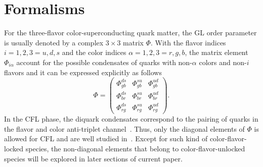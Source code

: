 \documentclass[12pt]{article}
\begin{document}
\section{\bf Formalisms}
\label{sec:2}
\vspace{0.2cm}

For the three-flavor color-superconducting quark matter, the GL order parameter is usually denoted by a complex $3\times3$ matrix $\Phi$. With the flavor indices $i = 1, 2, 3 = u, d, s$ and the color indices $\alpha = 1, 2, 3 = r, g, b$, the matrix element $\Phi_{i \alpha}$ account for the possible condensates of quarks with non-$\alpha$ colors and non-$i$ flavors and it can be expressed explicitly as follows
\begin{equation}
  \label{eq:diquarkmatrix}
  \Phi =
  \begin{pmatrix}
    \Phi_{gb}^{ds} &  \Phi_{gb}^{su} & \Phi_{gb}^{ud} \\
    \Phi_{br}^{ds} &  \Phi_{br}^{su} & \Phi_{br}^{ud} \\
    \Phi_{rg}^{ds} &  \Phi_{rg}^{su} & \Phi_{rg}^{ud}
  \end{pmatrix}.
\end{equation}
In the CFL phase, the diquark condensates correspond to the pairing of quarks in the flavor and color anti-triplet channel~\cite{alford1998qcd}.
%
Thus, only the diagonal elements of $\Phi$ is allowed for CFL and are well studied in~\cite{giannakis2002ginzburg,iida2002superfluid}.
Except for such kind of color-flavor-locked species, the non-diagonal elements that belong to color-flavor-unlocked species
will be explored in later sections of current paper.
\end{document}
